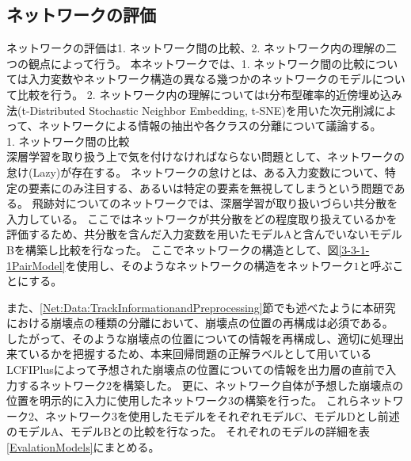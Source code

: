 \subsection{ネットワークの評価} \label{Net:PM:PerformanceofPM}

ネットワークの評価は1. ネットワーク間の比較、2. ネットワーク内の理解の二つの観点によって行う。
本ネットワークでは、1. ネットワーク間の比較については入力変数やネットワーク構造の異なる幾つかのネットワークのモデルについて比較を行う。
2. ネットワーク内の理解についてはt分布型確率的近傍埋め込み法(t-Distributed Stochastic Neighbor Embedding, t-SNE\cite{t-SNEpaper})を用いた次元削減によって、ネットワークによる情報の抽出や各クラスの分離について議論する。\\

1. ネットワーク間の比較\\

深層学習を取り扱う上で気を付けなければならない問題として、ネットワークの怠け(Lazy)が存在する。
ネットワークの怠けとは、ある入力変数について、特定の要素にのみ注目する、あるいは特定の要素を無視してしまうという問題である。
飛跡対についてのネットワークでは、深層学習が取り扱いづらい共分散を入力している。
ここではネットワークが共分散をどの程度取り扱えているかを評価するため、共分散を含んだ入力変数を用いたモデルAと含んでいないモデルBを構築し比較を行なった。
ここでネットワークの構造として、図\ref{3-3-1-1PairModel}を使用し、そのようなネットワークの構造をネットワーク$1$と呼ぶことにする。

また、\ref{Net:Data:TrackInformationandPreprocessing}節でも述べたように本研究における崩壊点の種類の分離において、崩壊点の位置の再構成は必須である。
したがって、そのような崩壊点の位置についての情報を再構成し、適切に処理出来ているかを把握するため、本来回帰問題の正解ラベルとして用いているLCFIPlusによって予想された崩壊点の位置についての情報を出力層の直前で入力するネットワーク2を構築した。
更に、ネットワーク自体が予想した崩壊点の位置を明示的に入力に使用したネットワーク3の構築を行った。
これらネットワーク2、ネットワーク3を使用したモデルをそれぞれモデルC、モデルDとし前述のモデルA、モデルBとの比較を行なった。
それぞれのモデルの詳細を表\ref{EvalationModels}にまとめる。

